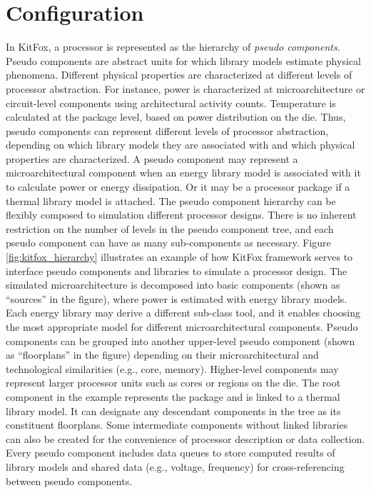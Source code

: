\section{Configuration} \label{sec:configuration}
\noindent
In KitFox, a processor is represented as the hierarchy of \emph{pseudo components}.
Pseudo components are abstract units for which library models estimate physical phenomena.
Different physical properties are characterized at different levels of processor abstraction.
For instance, power is characterized at microarchitecture or circuit-level components using architectural activity counts.
Temperature is calculated at the package level, based on power distribution on the die.
Thus, pseudo components can represent different levels of processor abstraction, depending on which library models they are associated with and which physical properties are characterized.
A pseudo component may represent a microarchitectural component when an energy library model is associated with it to calculate power or energy dissipation.
Or it may be a processor package if a thermal library model is attached.
The pseudo component hierarchy can be flexibly composed to simulation different processor designs.
There is no inherent restriction on the number of levels in the pseudo component tree, and each pseudo component can have as many sub-components as necessary.
Figure \ref{fig:kitfox_hierarchy} illustrates an example of how KitFox framework serves to interface pseudo components and libraries to simulate a processor design. 
The simulated microarchitecture is decomposed into basic components (shown as ``sources'' in the figure), where power is estimated with energy library models.
Each energy library may derive a different sub-class tool, and it enables choosing the most appropriate model for different microarchitectural components.
Pseudo components can be grouped into another upper-level pseudo component (shown as ``floorplans'' in the figure) depending on their microarchitectural and technological similarities (e.g., core, memory).
Higher-level components may represent larger processor units such as cores or regions on the die.
The root component in the example represents the package and is linked to a thermal library model.
It can designate any descendant components in the tree as its constituent floorplans.
Some intermediate components without linked libraries can also be created for the convenience of processor description or data collection.
Every pseudo component includes data queues to store computed results of library models and shared data (e.g., voltage, frequency) for cross-referencing between pseudo components.


